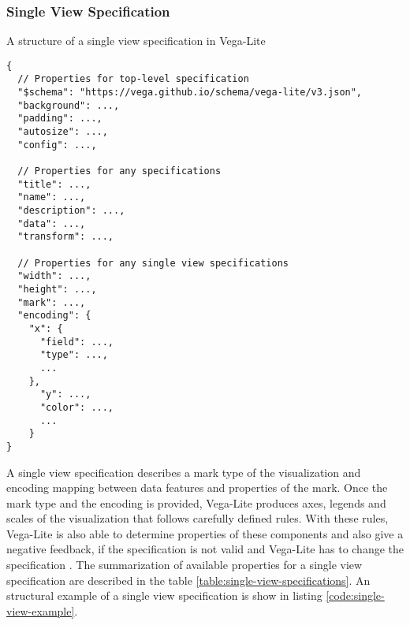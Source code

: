   \subsubsection{Single View Specification}

  \begin{listing}[htbp]
  \caption{\label{code:single-view-example}A structure of a single view specification in Vega-Lite \cite{vega-lite-single-view-specification}}
  \begin{verbatim}
{
  // Properties for top-level specification
  "$schema": "https://vega.github.io/schema/vega-lite/v3.json",
  "background": ...,
  "padding": ...,
  "autosize": ...,
  "config": ...,

  // Properties for any specifications
  "title": ...,
  "name": ...,
  "description": ...,
  "data": ...,
  "transform": ...,

  // Properties for any single view specifications
  "width": ...,
  "height": ...,
  "mark": ...,
  "encoding": {
    "x": {
      "field": ...,
      "type": ...,
      ...
    },
      "y": ...,
      "color": ...,
      ...
    }
}
\end{verbatim}
\end{listing}
  A single view specification describes a mark type of the visualization and encoding mapping between data features and properties of the mark. Once the mark type and the encoding is provided, Vega-Lite produces axes, legends and scales of the visualization that follows carefully defined rules. With these rules, Vega-Lite is also able to determine properties of these components and also give a negative feedback, if the specification is not valid and Vega-Lite has to change the specification \cite{vega-lite-single-view-specification}. The summarization of available properties for a single view specification are described in the table \ref{table:single-view-specifications}. An structural example of a single view specification is show in listing \ref{code:single-view-example}.

